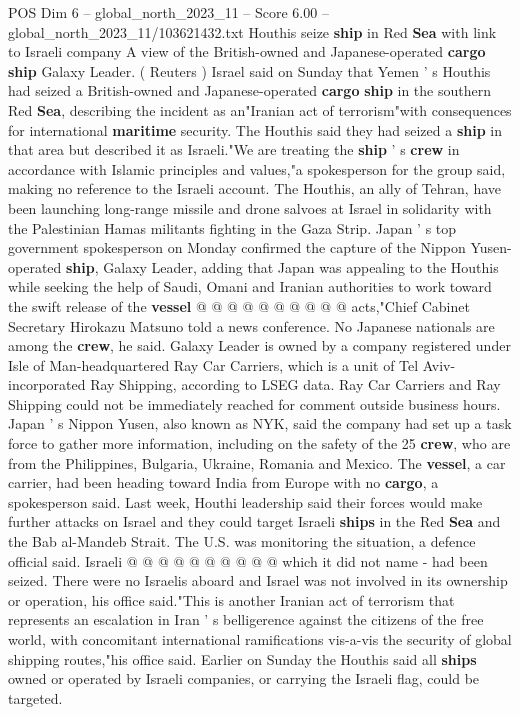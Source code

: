 \begin{textsample}{POS Dim 6 – global\_north\_2023\_11 – Score 6.00 – global\_north\_2023\_11/103621432.txt}  \label{ex:f6_pos_253}
Houthis seize \textbf{ship} in Red \textbf{Sea} with link to Israeli company A view of the British-owned and Japanese-operated \textbf{cargo} \textbf{ship} Galaxy Leader. ( Reuters ) Israel said on Sunday that Yemen ' s Houthis had seized a British-owned and Japanese-operated \textbf{cargo} \textbf{ship} in the southern Red \textbf{Sea}, describing the incident as an"Iranian act of terrorism"with consequences for international \textbf{maritime} security.
The Houthis said they had seized a \textbf{ship} in that area but described it as Israeli."We are treating the \textbf{ship} ' s \textbf{crew} in accordance with Islamic principles and values,"a spokesperson for the group said, making no reference to the Israeli account.
The Houthis, an ally of Tehran, have been launching long-range missile and drone salvoes at Israel in solidarity with the Palestinian Hamas militants fighting in the Gaza Strip.
Japan ' s top government spokesperson on Monday confirmed the capture of the Nippon Yusen-operated \textbf{ship}, Galaxy Leader, adding that Japan was appealing to the Houthis while seeking the help of Saudi, Omani and Iranian authorities to work toward the swift release of the \textbf{vessel} @ @ @ @ @ @ @ @ @ @ acts,"Chief Cabinet Secretary Hirokazu Matsuno told a news conference.
No Japanese nationals are among the \textbf{crew}, he said.
Galaxy Leader is owned by a company registered under Isle of Man-headquartered Ray Car Carriers, which is a unit of Tel Aviv-incorporated Ray Shipping, according to LSEG data.
Ray Car Carriers and Ray Shipping could not be immediately reached for comment outside business hours.
Japan ' s Nippon Yusen, also known as NYK, said the company had set up a task force to gather more information, including on the safety of the 25 \textbf{crew}, who are from the Philippines, Bulgaria, Ukraine, Romania and Mexico.
The \textbf{vessel}, a car carrier, had been heading toward India from Europe with no \textbf{cargo}, a spokesperson said.
Last week, Houthi leadership said their forces would make further attacks on Israel and they could target Israeli \textbf{ships} in the Red \textbf{Sea} and the Bab al-Mandeb Strait.
The U.S. was monitoring the situation, a defence official said.
Israeli @ @ @ @ @ @ @ @ @ @ which it did not name - had been seized.
There were no Israelis aboard and Israel was not involved in its ownership or operation, his office said."This is another Iranian act of terrorism that represents an escalation in Iran ' s belligerence against the citizens of the free world, with concomitant international ramifications vis-a-vis the security of global shipping routes,"his office said.
Earlier on Sunday the Houthis said all \textbf{ships} owned or operated by Israeli companies, or carrying the Israeli flag, could be targeted.

\end{textsample}
